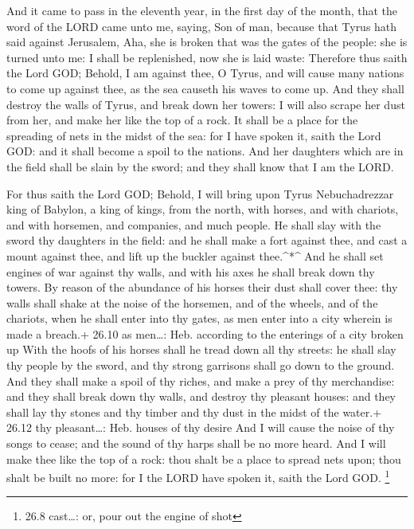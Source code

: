  And it came to pass in the eleventh year, in the first day
of the month, that the word of the LORD came unto me, saying,
 Son of man, because that Tyrus hath said against Jerusalem,
Aha, she is broken that was the gates of the people: she is turned unto
me: I shall be replenished, now she is laid waste: 
Therefore thus saith the Lord GOD; Behold, I am against thee, O Tyrus,
and will cause many nations to come up against thee, as the sea causeth
his waves to come up.  And they shall destroy the walls of
Tyrus, and break down her towers: I will also scrape her dust from her,
and make her like the top of a rock.  It shall be a place
for the spreading of nets in the midst of the sea: for I have spoken it,
saith the Lord GOD: and it shall become a spoil to the nations.
 And her daughters which are in the field shall be slain by
the sword; and they shall know that I am the LORD.

 For thus saith the Lord GOD; Behold, I will bring upon
Tyrus Nebuchadrezzar king of Babylon, a king of kings, from the north,
with horses, and with chariots, and with horsemen, and companies, and
much people.  He shall slay with the sword thy daughters in
the field: and he shall make a fort against thee, and cast a mount
against thee, and lift up the buckler against thee.\^{}*\^{}
 And he shall set engines of war against thy walls, and with
his axes he shall break down thy towers.  By reason of the
abundance of his horses their dust shall cover thee: thy walls shall
shake at the noise of the horsemen, and of the wheels, and of the
chariots, when he shall enter into thy gates, as men enter into a city
wherein is made a breach.+ 26.10 as men\ldots: Heb. according to the
enterings of a city broken up  With the hoofs of his horses
shall he tread down all thy streets: he shall slay thy people by the
sword, and thy strong garrisons shall go down to the ground.
 And they shall make a spoil of thy riches, and make a prey
of thy merchandise: and they shall break down thy walls, and destroy thy
pleasant houses: and they shall lay thy stones and thy timber and thy
dust in the midst of the water.+ 26.12 thy pleasant\ldots: Heb. houses
of thy desire  And I will cause the noise of thy songs to
cease; and the sound of thy harps shall be no more heard. 
And I will make thee like the top of a rock: thou shalt be a place to
spread nets upon; thou shalt be built no more: for I the LORD have
spoken it, saith the Lord GOD. \footnote{26.8 cast\ldots: or, pour out
  the engine of shot}

